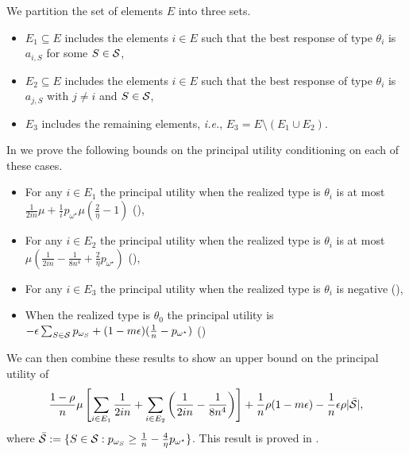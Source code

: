     We partition the set of elements $E$ into three sets.
    \begin{itemize}
	\item $E_1\subseteq E$ includes the elements $i\in E$ such that the best response of type $\theta_i$ is $a_{i,S}$ for some $S \in \mathcal{S}$,
	\item $E_2\subseteq E$ includes  the elements $i\in E$ such that the best response of type $\theta_i$ is $a_{j,S}$ with $j\neq i$ and $S \in \mathcal{S}$,
	\item $E_3$ includes the remaining elements, \emph{i.e.}, $E_3=E \setminus (E_1\cup E_2)$.
    \end{itemize}
    
    In  we prove the following bounds on the principal utility conditioning on each of these cases.
    \begin{itemize}
        \item For any $i\in E_1$ the principal utility when the realized type is $\theta_i$ is at most $\frac{1}{2in}\mu+\frac{1}{i}p_{\omega^\star}\mu\left(\frac2\eta-1\right)$ (),
        \item For any $i\in E_2$ the principal utility when the realized type is $\theta_i$ is at most $\mu\left(\frac{1}{2in}-\frac{1}{8n^4}+\frac{2}{\eta}p_{\omega^\star}\right)$ (),
        \item For any $i\in E_3$ the principal utility when the realized type is $\theta_i$ is negative (),
        \item When the realized type is $\theta_0$ the principal utility is $-\epsilon\sum_{S\in\mathcal{S}}p_{\omega_S}+(1-m\epsilon)(\frac{1}{n}-p_{\omega^\star})$ ()
    \end{itemize}

    We can then combine these results to show an upper bound on the principal utility of
    \begin{equation}\label{eq:upperboundutils}
    \frac{1-\rho}{n}\mu\left[\sum_{i\in E_1}\frac{1}{2in}+\sum_{i\in E_2}\left(\frac{1}{2in}-\frac{1}{8n^4}\right)\right]+\frac{1}{n}\rho(1-m\epsilon)-\frac{1}{n}\epsilon\rho|\bar{\mathcal{S}}|,
    \end{equation}
    where $\bar {\mathcal{S}}:=\{S\in\mathcal{S}: p_{\omega_S}\ge\frac{1}{n}-\frac{4}{\eta}p_{\omega^\star}\}$.
    This result is proved in .


